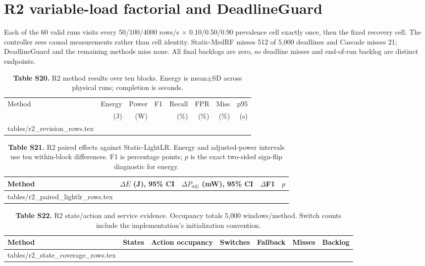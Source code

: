 \documentclass[10pt,a4paper]{article}
\makeatletter
\newcommand{\tableinput}[1]{\@@input #1.tex }
\makeatother
\begin{document}
\clearpage
\section{R2 variable-load factorial and DeadlineGuard}
Each of the 60 valid runs visits every 50/100/4000 rows/s $\times$ 0.10/0.50/0.90 prevalence cell exactly once, then the fixed recovery cell. The controller sees causal measurements rather than cell identity. Static-MedRF misses 512 of 5,000 deadlines and Cascade misses 21; DeadlineGuard and the remaining methods miss none. All final backlogs are zero, so deadline misses and end-of-run backlog are distinct endpoints.

\begin{table}[h!]
\centering\footnotesize
\caption*{\textbf{Table S20.} R2 method results over ten blocks. Energy is mean$\pm$SD across physical runs; completion is seconds.}
\setlength{\tabcolsep}{2.6pt}
\begin{tabular}{lrrrrrrr}\toprule
Method & Energy & Power & F1 & Recall & FPR & Miss & p95\\
 & (J) & (W) & & (\%) & (\%) & (\%) & (s)\\\midrule
\tableinput{tables/r2_revision_rows}
\bottomrule\end{tabular}
\end{table}

\begin{table}[h!]
\centering\scriptsize
\caption*{\textbf{Table S21.} R2 paired effects against Static-LightLR. Energy and adjusted-power intervals use ten within-block differences. F1 is percentage points; $p$ is the exact two-sided sign-flip diagnostic for energy.}
\setlength{\tabcolsep}{2.5pt}
\begin{tabular}{lrrrr}\toprule
Method & $\Delta E$ (J), 95\% CI & $\Delta P_{adj}$ (mW), 95\% CI & $\Delta$F1 & $p$\\\midrule
\tableinput{tables/r2_paired_lightlr_rows}
\bottomrule\end{tabular}
\end{table}

\begin{table}[h!]
\centering\scriptsize
\caption*{\textbf{Table S22.} R2 state/action and service evidence. Occupancy totals 5,000 windows/method. Switch counts include the implementation's initialization convention.}
\setlength{\tabcolsep}{2.2pt}
\begin{tabular}{lrlrrrr}\toprule
Method & States & Action occupancy & Switches & Fallback & Misses & Backlog\\\midrule
\tableinput{tables/r2_state_coverage_rows}
\bottomrule\end{tabular}
\end{table}
\end{document}
